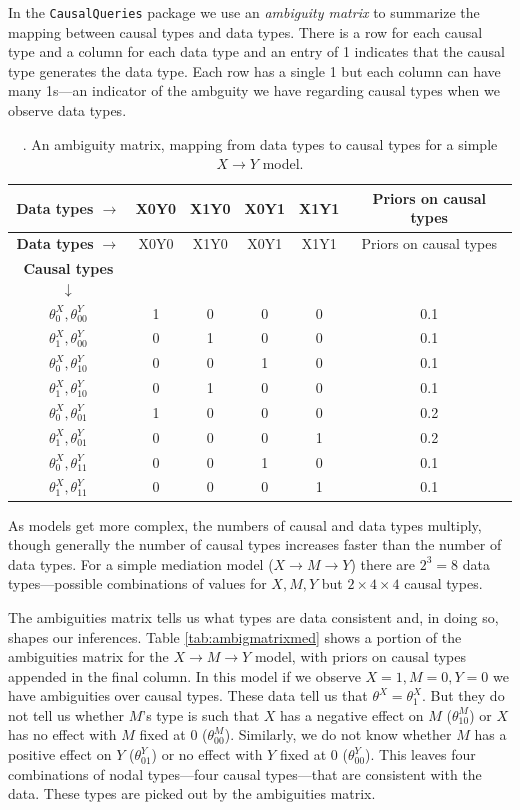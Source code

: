\documentclass[
  12pt,
]{book}
\begin{document}
In the \texttt{CausalQueries} package we use an \emph{ambiguity matrix} to summarize the mapping between causal types and data types. There is a row for each causal type and a column for each data type and an entry of 1 indicates that the causal type generates the data type. Each row has a single 1 but each column can have many 1s---an indicator of the ambguity we have regarding causal types when we observe data types.

\begin{longtable}[]{@{}cccccc@{}}
\caption{\label{tab:ambigmatrix}. An ambiguity matrix, mapping from data types to causal types for a simple \(X \rightarrow Y\) model.}\tabularnewline
\toprule
\textbf{Data types} \(\rightarrow\) & X0Y0 & X1Y0 & X0Y1 & X1Y1 & Priors on causal types \\
\midrule
\endfirsthead
\toprule
\textbf{Data types} \(\rightarrow\) & X0Y0 & X1Y0 & X0Y1 & X1Y1 & Priors on causal types \\
\midrule
\endhead
\textbf{Causal types} \(\downarrow\) & & & & & \\
\(\theta^X_0,\theta^Y_{00}\) & 1 & 0 & 0 & 0 & 0.1 \\
\(\theta^X_1,\theta^Y_{00}\) & 0 & 1 & 0 & 0 & 0.1 \\
\(\theta^X_0,\theta^Y_{10}\) & 0 & 0 & 1 & 0 & 0.1 \\
\(\theta^X_1,\theta^Y_{10}\) & 0 & 1 & 0 & 0 & 0.1 \\
\(\theta^X_0,\theta^Y_{01}\) & 1 & 0 & 0 & 0 & 0.2 \\
\(\theta^X_1,\theta^Y_{01}\) & 0 & 0 & 0 & 1 & 0.2 \\
\(\theta^X_0,\theta^Y_{11}\) & 0 & 0 & 1 & 0 & 0.1 \\
\(\theta^X_1,\theta^Y_{11}\) & 0 & 0 & 0 & 1 & 0.1 \\
\bottomrule
\end{longtable}

As models get more complex, the numbers of causal and data types multiply, though generally the number of causal types increases faster than the number of data types. For a simple mediation model (\(X \rightarrow M \rightarrow Y\)) there are \(2^3 = 8\) data types---possible combinations of values for \(X,M,Y\) but \(2\times 4 \times 4\) causal types.

The ambiguities matrix tells us what types are data consistent and, in doing so, shapes our inferences.
Table \ref{tab:ambigmatrixmed} shows a portion of the ambiguities matrix for the \(X \rightarrow M \rightarrow Y\) model, with priors on causal types appended in the final column. In this model if we observe \(X=1, M=0, Y=0\) we have ambiguities over causal types. These data tell us that \(\theta^X = \theta^X_1\). But they do not tell us whether \(M\)'s type is such that \(X\) has a negative effect on \(M\) (\(\theta^M_{10}\)) or \(X\) has no effect with \(M\) fixed at \(0\) (\(\theta^M_{00}\)). Similarly, we do not know whether \(M\) has a positive effect on \(Y\) (\(\theta^Y_{01}\)) or no effect with \(Y\) fixed at \(0\) (\(\theta^Y_{00}\)). This leaves four combinations of nodal types---four causal types---that are consistent with the data. These types are picked out by the ambiguities matrix.
\end{document}
